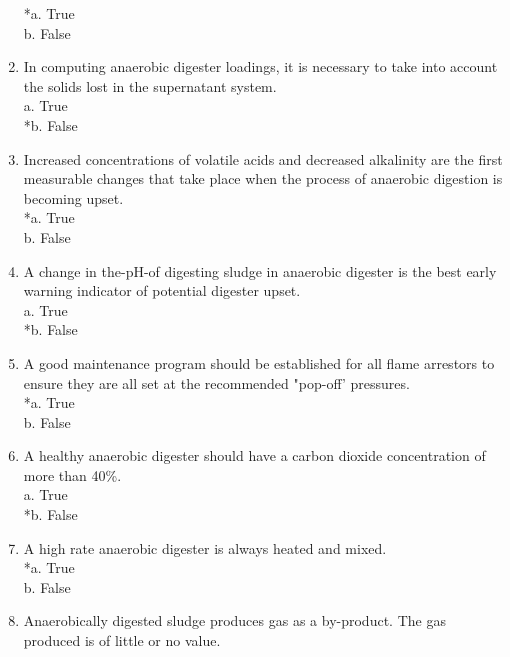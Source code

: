 \documentclass{article}
\begin{document}
\begin{enumerate}
*a. True \\
b. False \\

\item  In computing anaerobic digester loadings, it is necessary to take into account the solids lost in the supernatant system. \\

a. True \\
*b. False \\

\item  Increased concentrations of volatile acids and decreased alkalinity are the first measurable changes that take place when the process of anaerobic digestion is becoming upset. \\

*a. True \\
b. False \\

\item  A change in the-pH-of digesting sludge in anaerobic digester is the best early warning indicator of potential digester upset. \\

a. True \\
*b. False \\

\item  A good maintenance program should be established for all flame arrestors to ensure they are all set at the recommended "pop-off' pressures. \\

*a. True \\
b. False \\

\item  A healthy anaerobic digester should have a carbon dioxide concentration of more than 40\%. \\

a. True \\
*b. False \\

\item  A high rate anaerobic digester is always heated and mixed. \\

*a. True \\
b. False \\

\item  Anaerobically digested sludge produces gas as a by-product. The gas produced is of little or no value. \\


\end{enumerate}
\end{document}
